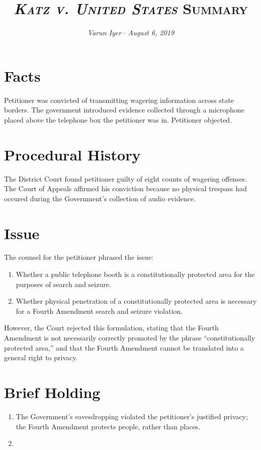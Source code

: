 \documentclass[paper=letter,fontsize=10pt]{article}
\title{\textsc{\textit{Katz v. United States} Summary}}
\date{}
\author{\textit{Varun Iyer} \hspace{.5em} $\cdot$ \hspace{.5em} \textit{August 6, 2019}}
\newcommand{\pet}[1]{{\color{navy}{#1}}}
\begin{document}
\maketitle
\section{Facts}
	Petitioner was convicted of transmitting wagering information across state borders. The government introduced evidence collected through a microphone placed above the telephone box the petitioner was in. Petitioner objected.
\section{Procedural History}
	The District Court found petitioner guilty of eight counts of wagering offenses. The Court of Appeals affirmed his conviction because no physical trespass had occured during the Government’s collection of audio evidence.
\section{Issue}
	The counsel for the petitioner phrased the issue:	
	\begin{enumerate}
		\item Whether a public telephone booth is a constitutionally protected area for the purposes of search and seizure.
		\item Whether physical penetration of a constitutionally protected area is necessary for a Fourth Amendment search and seizure violation.
	\end{enumerate}
	However, the Court rejected this formulation, stating that the Fourth Amendment is not necessarily correctly promoted by the phrase “constitutionally protected area,” and that the Fourth Amendment cannot be translated into a general right to privacy.
\section{Brief Holding}
	\begin{enumerate}
		\item The Government’s eavesdropping violated the petitioner’s justified privacy; the Fourth Amendment protects people, rather than places.
		\item \pet{Although surveillance in this case was narrowly circumscribed, it was not in fact conducted pursuant to the warrant procedure.}
	\end{enumerate}
\end{document}

